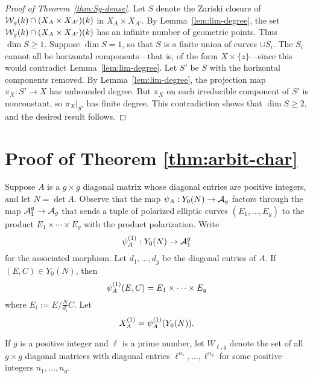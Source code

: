 \documentclass{amsart}
\begin{document}
\begin{proof}[Proof of Theorem~\ref{thm:Sg-dense}]
  Let $S$ denote the Zariski closure of $\mathcal{W}_g(k) \cap (X_A \times X_{A'})(k)$ in $X_A \times X_{A'}$. By Lemma~\ref{lem:lim-degree}, the set $\mathcal{W}_g(k) \cap (X_A \times X_{A'})(k)$ has an infinite number of geometric points. Thus $\dim S \geq 1$. Suppose $\dim S = 1$, so that $S$ is a finite union of curves $\cup S_i$. The $S_i$ cannot all be horizontal components---that is, of the form $X \times \{z\}$---since this would contradict Lemma~\ref{lem:lim-degree}. Let $S'$ be $S$ with the horizontal components removed. By Lemma~\ref{lem:lim-degree}, the projection map $\pi_X: S' \to X$ has unbounded degree. But $\pi_X$ on each irreducible component of $S'$ is nonconstant, so $\pi_X|_{S'}$ has finite degree. This contradiction shows that $\dim S \geq 2$, and the desired result follows.
\end{proof}







\section{Proof of Theorem \ref{thm:arbit-char}}
\label{sec:characteristic-p}



Suppose $A$ is a $g \times g$ diagonal matrix whose diagonal entries are positive integers, and let $N = \det A$. Observe that the map $\psi_{A}: Y_0(N) \to \mathcal{A}_g$ factors through the map $\mathcal{A}_1^g \to \mathcal{A}_g$ that sends a tuple of polarized elliptic curves $(E_1,\dots,E_g)$ to the product $E_1 \times \cdots \times E_g$ with the product polarization. Write
\[
\psi_{A}^{(1)}: Y_0(N) \to \mathcal{A}_1^g
\]
for the associated morphism. Let $d_1, \ldots, d_g$ be the diagonal entries of $A$. If $(E, C) \in Y_0(N)$, then
\[
  \psi_{A}^{(1)}(E,C) = E_1 \times \cdots \times E_g
\]
where  $E_i := E/\frac{N}{d_i}C$.
Let $$X^{(1)}_A = \psi_{A}^{(1)}(Y_0(N)).$$

  If $g$ is a positive integer and $\ell$ is a prime number, let $W_{\ell,g}$ denote the set of all $g \times g$ diagonal matrices with diagonal entries $\ell^{n_1},\dots,\ell^{n_g}$ for some positive integers $n_1,\dots,n_g$. 
\end{document}
